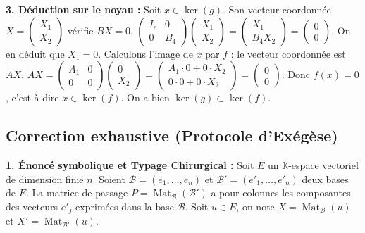 \documentclass{report}
\begin{document}
\textbf{3. Déduction sur le noyau :}
Soit $x \in \ker(g)$. Son vecteur coordonnée $X = \begin{pmatrix} X_1 \\ X_2 \end{pmatrix}$ vérifie $BX = 0$.
$\begin{pmatrix} I_r & 0 \\ 0 & B_4 \end{pmatrix} \begin{pmatrix} X_1 \\ X_2 \end{pmatrix} = \begin{pmatrix} X_1 \\ B_4 X_2 \end{pmatrix} = \begin{pmatrix} 0 \\ 0 \end{pmatrix}$.
On en déduit que $X_1 = 0$.
Calculons l'image de $x$ par $f$ : le vecteur coordonnée est $AX$.
$AX = \begin{pmatrix} A_1 & 0 \\ 0 & 0 \end{pmatrix} \begin{pmatrix} 0 \\ X_2 \end{pmatrix} = \begin{pmatrix} A_1 \cdot 0 + 0 \cdot X_2 \\ 0 \cdot 0 + 0 \cdot X_2 \end{pmatrix} = \begin{pmatrix} 0 \\ 0 \end{pmatrix}$.
Donc $f(x) = 0$, c'est-à-dire $x \in \ker(f)$.
On a bien $\ker(g) \subset \ker(f)$.







\subsection*{Correction exhaustive (Protocole d'Exégèse)}

\textbf{1. Énoncé symbolique et Typage Chirurgical :}
Soit $E$ un $\mathbb{K}$-espace vectoriel de dimension finie $n$. Soient $\mathcal{B} = (e_1, \dots, e_n)$ et $\mathcal{B}' = (e'_1, \dots, e'_n)$ deux bases de $E$.
La matrice de passage $P = \operatorname{Mat}_{\mathcal{B}}(\mathcal{B}')$ a pour colonnes les composantes des vecteurs $e'_j$ exprimées dans la base $\mathcal{B}$.
Soit $u \in E$, on note $X = \operatorname{Mat}_{\mathcal{B}}(u)$ et $X' = \operatorname{Mat}_{\mathcal{B}'}(u)$.
\end{document}
